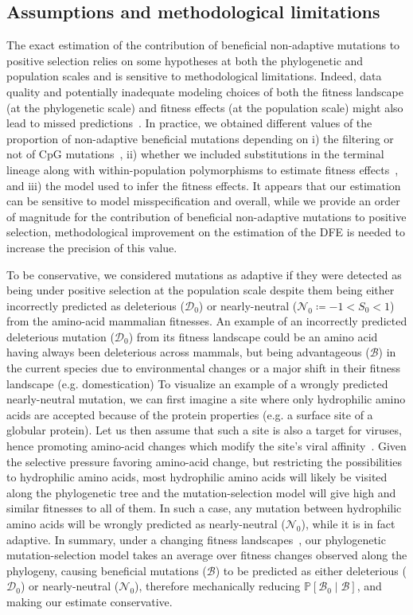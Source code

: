 \documentclass[10pt,letterpaper]{article}
\newcommand{\proba}{\mathbb{P}}
\newcommand{\Sphy}{S_{0}}
\newcommand{\SphyDel}{\mathcal{D}_0}
\newcommand{\SphyNeu}{\mathcal{N}_0}
\newcommand{\SphyBen}{\mathcal{B}_0}
\newcommand{\given}{\mid}
\newcommand{\SpopBen}{\mathcal{B}}
\begin{document}
\subsection*{Assumptions and methodological limitations}

The exact estimation of the contribution of beneficial non-adaptive mutations to positive selection relies on some hypotheses at both the phylogenetic and population scales and is sensitive to methodological limitations.
Indeed, data quality and potentially inadequate modeling choices of both the fitness landscape (at the phylogenetic scale) and fitness effects (at the population scale) might also lead to missed predictions~\cite{moutinho_variation_2019}.
In practice, we obtained different values of the proportion of non-adaptive beneficial mutations depending on i) the filtering or not of CpG mutations~\cite{eyre-walker_how_2014}, ii) whether we included substitutions in the terminal lineage along with within-population polymorphisms to estimate fitness effects~\cite{tataru_inference_2017}, and iii) the model used to infer the fitness effects.
It appears that our estimation can be sensitive to model misspecification and overall, while we provide an order of magnitude for the contribution of beneficial non-adaptive mutations to positive selection, methodological improvement on the estimation of the DFE is needed to increase the precision of this value.

To be conservative, we considered mutations as adaptive if they were detected as being under positive selection at the population scale despite them being either incorrectly predicted as deleterious ($\SphyDel$) or nearly-neutral ($\SphyNeu \coloneqq -1 < \Sphy <1$) from the amino-acid mammalian fitnesses.
An example of an incorrectly predicted deleterious mutation ($\SphyDel$) from its fitness landscape could be an amino acid having always been deleterious across mammals, but being advantageous ($\SpopBen$) in the current species due to environmental changes or a major shift in their fitness landscape (e.g. domestication)
To visualize an example of a wrongly predicted nearly-neutral mutation, we can first imagine a site where only hydrophilic amino acids are accepted because of the protein properties (e.g. a surface site of a globular protein).
Let us then assume that such a site is also a target for viruses, hence promoting amino-acid changes which modify the site's viral affinity~\cite{enard_viruses_2016}.
Given the selective pressure favoring amino-acid change, but restricting the possibilities to hydrophilic amino acids, most hydrophilic amino acids will likely be visited along the phylogenetic tree and the mutation-selection model will give high and similar fitnesses to all of them.
In such a case, any mutation between hydrophilic amino acids will be wrongly predicted as nearly-neutral ($\SphyNeu$), while it is in fact adaptive.
In summary, under a changing fitness landscapes~\cite{mustonen_molecular_2008}, our phylogenetic mutation-selection model takes an average over fitness changes observed along the phylogeny, causing beneficial mutations ($\SpopBen$) to be predicted as either deleterious ($\SphyDel$) or nearly-neutral ($\SphyNeu$), therefore mechanically reducing $\proba [ \SphyBen \given \SpopBen]$, and making our estimate conservative.
\end{document}
